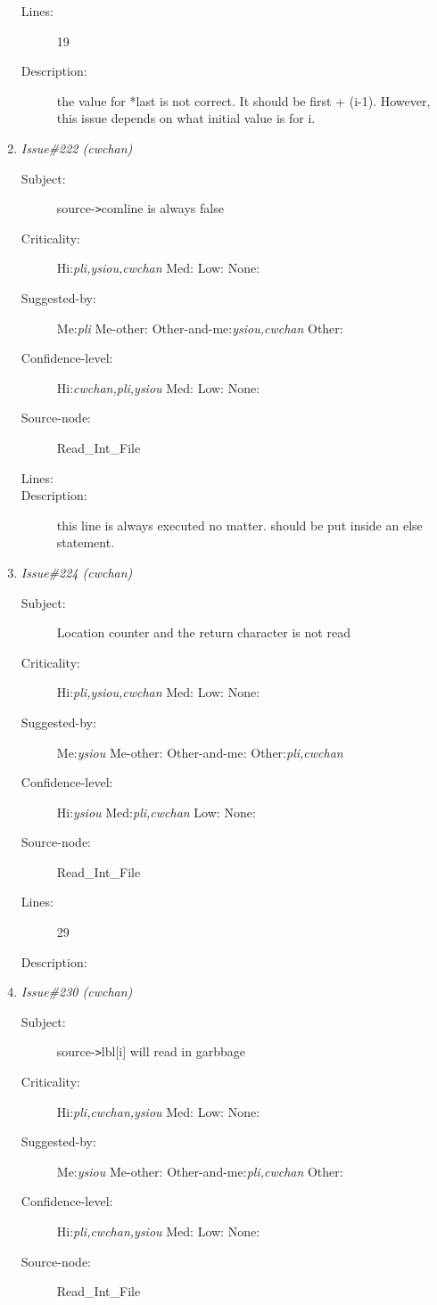 \begin{enumerate}
\begin{description}
\item [Lines:] 19

\item [Description:] the value for *last is not correct. It should
be first + (i-1). However, this issue depends on what initial value is for i.
\end{description}
\item {\it Issue\#222 (cwchan)}
\begin{description}
\item [Subject:] source-{\tt >}comline is always false
\item [Criticality:] Hi:{\it pli,ysiou,cwchan} Med:{\it } Low:{\it } None:{\it }
\item [Suggested-by:] Me:{\it pli} Me-other:{\it } Other-and-me:{\it ysiou,cwchan} Other:{\it }
\item [Confidence-level:] Hi:{\it cwchan,pli,ysiou} Med:{\it } Low:{\it } None:{\it }
\item [Source-node:] Read\_Int\_File

\item [Lines:] 

\item [Description:] this line is always executed no matter. should
be put inside an else statement.
\end{description}
\item {\it Issue\#224 (cwchan)}
\begin{description}
\item [Subject:] Location counter and the return character is not read
\item [Criticality:] Hi:{\it pli,ysiou,cwchan} Med:{\it } Low:{\it } None:{\it }
\item [Suggested-by:] Me:{\it ysiou} Me-other:{\it } Other-and-me:{\it } Other:{\it pli,cwchan}
\item [Confidence-level:] Hi:{\it ysiou} Med:{\it pli,cwchan} Low:{\it } None:{\it }
\item [Source-node:] Read\_Int\_File

\item [Lines:] 29

\item [Description:] 
\end{description}
\item {\it Issue\#230 (cwchan)}
\begin{description}
\item [Subject:] source-{\tt >}lbl[i] will read in garbbage
\item [Criticality:] Hi:{\it pli,cwchan,ysiou} Med:{\it } Low:{\it } None:{\it }
\item [Suggested-by:] Me:{\it ysiou} Me-other:{\it } Other-and-me:{\it pli,cwchan} Other:{\it }
\item [Confidence-level:] Hi:{\it pli,cwchan,ysiou} Med:{\it } Low:{\it } None:{\it }
\item [Source-node:] Read\_Int\_File


\end{description}
\end{enumerate}
